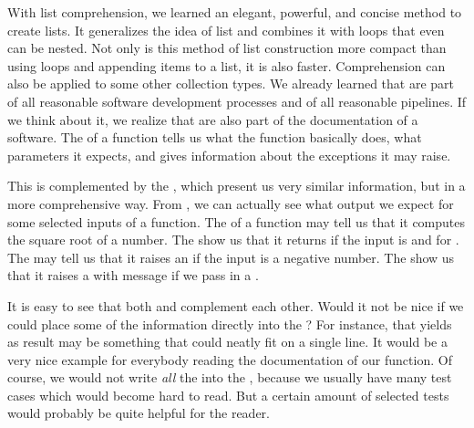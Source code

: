 With list comprehension, we learned an elegant, powerful, and concise method to create lists.
It generalizes the idea of list  and combines it with  loops that even can be nested.
Not only is this method of list construction more compact than using loops and appending items to a list, it is also faster.
Comprehension can also be applied to some other collection types.%
\FloatBarrier%
\endhsection%
%
%
\FloatBarrier%
%
%
%
%
%
%
We already learned that  are part of all reasonable software development processes and of all reasonable  pipelines.
If we think about it, we realize that  are also part of the documentation of a software.
The  of a function tells us what the function basically does, what parameters it expects, and gives information about the exceptions it may raise.

This is complemented by the , which present us very similar information, but in a more comprehensive way.
From , we can actually see what output we expect for some selected inputs of a function.
The  of a  function may tell us that it computes the square root of a number.
The  show us that it returns  if the input is  and  for .
The  may tell us that it raises an  if the input is a negative number.
The  show us that it raises a  with message \emph{} if we pass in a .

It is easy to see that both  and  complement each other.
Would it not be nice if we could place some of the  information directly into the ?
For instance, that  yields  as result may be something that could neatly fit on a single line.
It would be a very nice example for everybody reading the documentation of our function.
Of course, we would not write \emph{all} the  into the , because we usually have many test cases which would become hard to read.
But a certain amount of selected tests would probably be quite helpful for the reader.

